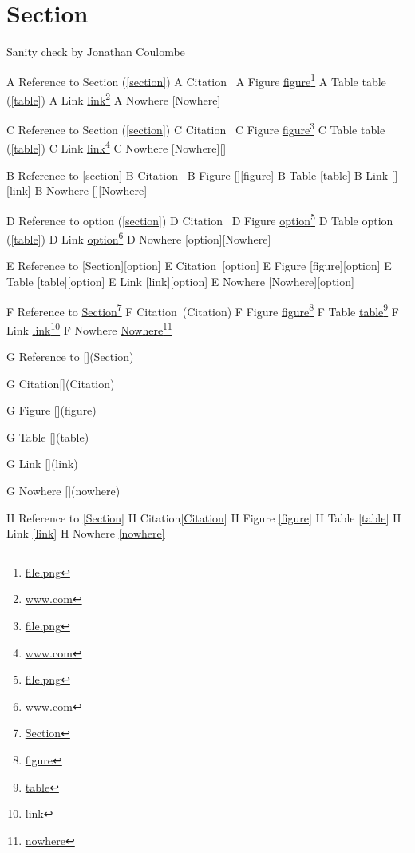 
\def\mytitle{MultiMarkdown Sanity Test}


\part{Section}
\label{section}

Sanity check by Jonathan Coulombe

A Reference to Section (\autoref{section})
A Citation~\citep{Citation}
A Figure \href{file.png}{figure}\footnote{\href{file.png}{file.png}}
A Table table (\autoref{table})
A Link \href{www.com}{link}\footnote{\href{www.com}{www.com}}
A Nowhere [Nowhere]

C Reference to Section (\autoref{section})
C Citation~\citep{Citation}
C Figure \href{file.png}{figure}\footnote{\href{file.png}{file.png}}
C Table table (\autoref{table})
C Link \href{www.com}{link}\footnote{\href{www.com}{www.com}}
C Nowhere [Nowhere][]

B Reference to \autoref{section}
B Citation~\citep{Citation}
B Figure [][figure]
B Table \autoref{table}
B Link [][link]
B Nowhere [][Nowhere]

D Reference to option (\autoref{section})
D Citation~\citep[option]{Citation}
D Figure \href{file.png}{option}\footnote{\href{file.png}{file.png}}
D Table option (\autoref{table})
D Link \href{www.com}{option}\footnote{\href{www.com}{www.com}}
D Nowhere [option][Nowhere]

E Reference to [Section][option]
E Citation~\citep{Citation}[option]
E Figure [figure][option]
E Table [table][option]
E Link [link][option]
E Nowhere [Nowhere][option]

F Reference to \href{Section}{Section}\footnote{\href{Section}{Section}}
F Citation~\citep{Citation}(Citation)
F Figure \href{figure}{figure}\footnote{\href{figure}{figure}}
F Table \href{table}{table}\footnote{\href{table}{table}}
F Link \href{link}{link}\footnote{\href{link}{link}}
F Nowhere \href{nowhere}{Nowhere}\footnote{\href{nowhere}{nowhere}}

G Reference to [](Section)

G Citation[](Citation)

G Figure [](figure)

G Table [](table)

G Link [](link)

G Nowhere [](nowhere)

H Reference to \autoref{Section}
H Citation\autoref{Citation}
H Figure \autoref{figure}
H Table \autoref{table}
H Link \autoref{link}
H Nowhere \autoref{nowhere}

